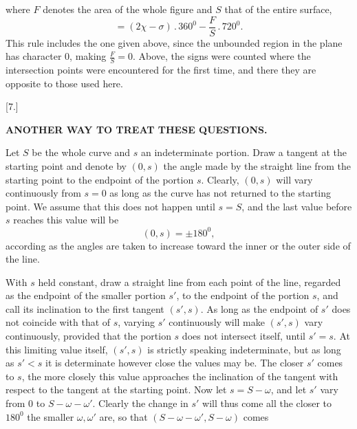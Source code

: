 %
\noindent where $F$ denotes the area of the whole figure and $S$ that of the entire surface,
\[
= (2\chi - \sigma) \, . \, 360^0 - \frac{F}{S} \,.\,720^0.
\]
This rule includes the one given above, since the unbounded region in the plane has character 0, making $\frac{F}{S} = 0$. Above, the signs were counted where the intersection points were encountered for the first time, and there they are opposite to those used here.

\begin{center}
[7.]
\end{center}

\begin{center}\textbf{ANOTHER WAY TO TREAT THESE QUESTIONS.}\end{center}

Let $S$ be the whole curve and $s$ an indeterminate portion. Draw a tangent at the starting point and denote by $(0, s)$ the angle made by the straight line from the starting point to the endpoint of the portion $s$. Clearly, $(0, s)$ will vary continuously from $s = 0$ as long as the curve has not returned to the starting point. We assume that this does not happen until $s = S$, and the last value before $s$ reaches this value will be
\[
(0, s) = \pm 180^0,
\]
according as the angles are taken to increase toward the inner or the outer side of the line.

With $s$ held constant, draw a straight line from each point of the line, regarded as the endpoint of the smaller portion $s'$, to the endpoint of the portion $s$, and call its inclination to the first tangent $(s', s)$. As long as the endpoint of $s'$ does not coincide with that of $s$, varying $s'$ continuously will make $(s', s)$ vary continuously, provided that the portion $s$ does not intersect itself, until $s' = s$. At this limiting value itself, $(s', s)$ is strictly speaking indeterminate, but as long as $s' < s$ it is determinate however close the values may be. The closer $s'$ comes to $s$, the more closely this value approaches the inclination of the tangent with respect to the tangent at the starting point. Now let $s = S - \omega$, and let $s'$ vary from $0$ to $S - \omega - \omega'$. Clearly the change in $s'$ will thus come all the closer to $180^0$ the smaller $\omega, \omega'$ are, so that $(S - \omega - \omega', S - \omega)$ comes
